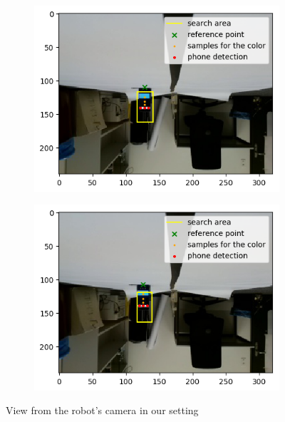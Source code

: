 \documentclass[14pt,a4paper]{article}
\theoremstyle{definition}
\begin{document}
\begin{figure}[ht]
        \begin{subfigure}[b]{0.49\textwidth}   
            \centering 
            \includegraphics[width=\textwidth]{img/vue46.png}
   
            \label{fig:mean and std of net34}
        \end{subfigure}
        \begin{subfigure}[b]{0.49\textwidth}   
            \centering 
            \includegraphics[width=\textwidth]{img/vue51.png}
  
            \label{fig:mean and std of net44}
        \end{subfigure}
        \caption{{\small View from the robot's camera in our setting}}
	\label{vue_robot}
\end{figure}
\end{document}
